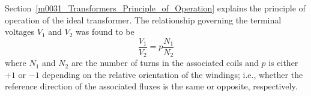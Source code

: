 

\label{m0032_Transformers_as_Two-Port_Devices} %

Section~\ref{m0031_Transformers_Principle_of_Operation} explains the principle of operation of the ideal transformer.
The relationship governing the terminal voltages $V_1$ and $V_2$ was found to be
%
\begin{equation}   
\frac{V_1}{V_2} = p\frac{N_1}{N_2}
\end{equation}
%
where $N_1$ and $N_2$ are the number of turns in the associated coils and $p$ is either $+1$ or $-1$ depending on the relative orientation of the windings; i.e., whether the reference direction of the associated fluxes is the same or opposite, respectively. 
 
